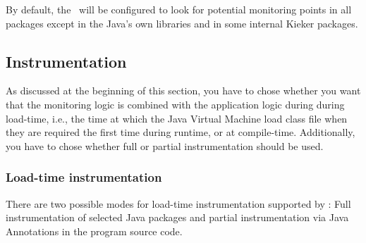 \documentclass[a4paper,12pt]{scrartcl}
\begin{document}
By default, the \tpmonltw\ will be configured to look for potential monitoring points in all packages except in the Java's own libraries and in some internal Kieker packages. %

%
%

\subsection{Instrumentation}
As discussed at the beginning of this section, you have to chose
 whether you want that the monitoring logic is combined with the application
 logic during during load-time, i.e., the time at which the Java Virtual Machine
 load class file when they are required the first time during runtime, or at compile-time. Additionally,
you have to chose whether full or partial instrumentation should be used.

%
%
\subsubsection{Load-time instrumentation}
There are two possible modes for load-time instrumentation supported by \tpmon:
 Full instrumentation of selected Java packages and partial instrumentation via Java Annotations
in the program source code.
\end{document}
